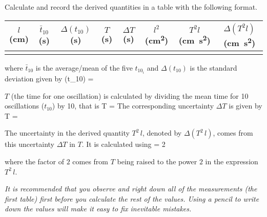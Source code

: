 \documentclass{article}
\begin{document}
         Calculate and record the derived quantities in a table with the following format.
        
         \begin{table}[h]
            \centering

            \begin{tabular}{| c || c | c | c | c || c | c | c ||}

               \hline
               $l$ (\si{\centi\metre}) & $\bar{t}_{10}$ (\si{\second}) & $\Delta(t_{10})$ (\si{\second}) & $T$ (\si{\second}) & $\Delta T$ (\si{\second}) & $l^2$ (\si{\square\centi\metre}) & $T^2 l$ (\si{\centi\metre \square\second}) & $\Delta (T^2 l)$ (\si{\centi\metre \square\second}) \\

               \hline
                  & & & & & & & \\
               \hline

            \end{tabular}
         \end{table}
         where $\bar{t}_{10}$ is the average/mean of the five $t_{10_i}$ and $\Delta (t_{10})$ is the standard deviation given by
         \beq \label{calc_Dt10}
            \Delta (t_{10}) = 
         \eeq
            
         
         $T$ (the time for one oscillation) is calculated by dividing the mean time for 10 oscillations ($t_{10}$) by 10, that is
         \beq \label{calc_T}
            T = 
         \eeq
         The corresponding uncertainty $\Delta T$ is given by
         \beq
            \Delta T = 
         \eeq

         The uncertainty in the derived quantity $T^2 \, l$, denoted by $\Delta (T^2 \, l)$, comes from this uncertainty $\Delta T$ in $T$. It is calculated using
         \beq \label{calc_DT2l}
             = 2 
         \eeq
         
         where the factor of $2$ comes from $T$ being raised to the power $2$ in the expression $T^2 \, l$.

         \textit{It is recommended that you observe and right down all of the measurements (the first table) first before you calculate the rest of the values. Using a pencil to write down the values will make it easy to fix inevitable mistakes.}
\end{document}
